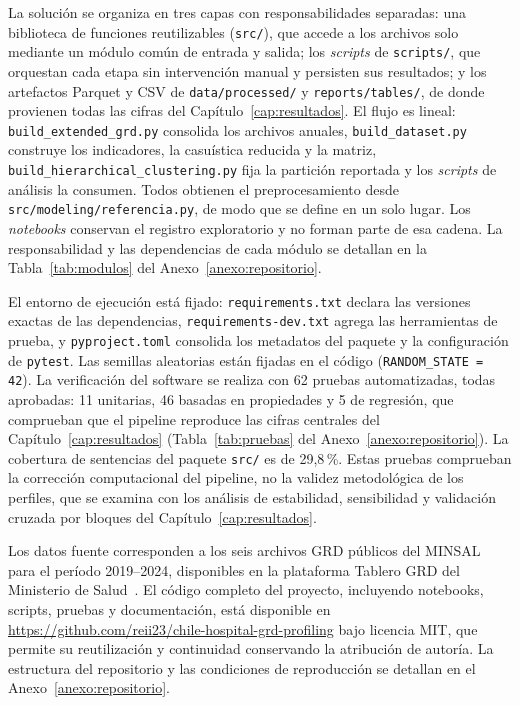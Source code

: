 La solución se organiza en tres capas con responsabilidades separadas: una
biblioteca de funciones reutilizables (\texttt{src/}), que accede a los archivos
solo mediante un módulo común de entrada y salida; los \textit{scripts} de
\texttt{scripts/}, que orquestan cada etapa sin intervención manual y persisten
sus resultados; y los artefactos Parquet y CSV de \texttt{data/processed/} y
\texttt{reports/tables/}, de donde provienen todas las cifras del
Capítulo~\ref{cap:resultados}. El flujo es lineal:
\texttt{build\_extended\_grd.py} consolida los archivos anuales,
\texttt{build\_dataset.py} construye los indicadores, la casuística reducida y
la matriz, \texttt{build\_hierarchical\_clustering.py} fija la partición
reportada y los \textit{scripts} de análisis la consumen. Todos obtienen el
preprocesamiento desde \texttt{src/modeling/referencia.py}, de modo que se
define en un solo lugar. Los \textit{notebooks} conservan el registro
exploratorio y no forman parte de esa cadena. La responsabilidad y las
dependencias de cada módulo se detallan en la Tabla~\ref{tab:modulos} del
Anexo~\ref{anexo:repositorio}.

El entorno de ejecución está fijado: \texttt{requirements.txt} declara las
versiones exactas de las dependencias, \texttt{requirements-dev.txt} agrega las
herramientas de prueba, y \texttt{pyproject.toml} consolida los metadatos del
paquete y la configuración de \texttt{pytest}. Las semillas aleatorias están
fijadas en el código (\texttt{RANDOM\_STATE = 42}). La verificación del
software se realiza con 62 pruebas automatizadas, todas aprobadas: 11
unitarias, 46 basadas en propiedades y 5 de regresión, que comprueban que el
pipeline reproduce las cifras centrales del Capítulo~\ref{cap:resultados}
(Tabla~\ref{tab:pruebas} del Anexo~\ref{anexo:repositorio}). La cobertura de
sentencias del paquete \texttt{src/} es de 29,8\,\%. Estas pruebas comprueban
la corrección computacional del pipeline, no la validez metodológica de los
perfiles, que se examina con los análisis de estabilidad, sensibilidad y
validación cruzada por bloques del Capítulo~\ref{cap:resultados}.

Los datos fuente corresponden a los seis archivos GRD públicos del MINSAL para el
período 2019--2024, disponibles en la plataforma Tablero GRD del Ministerio de
Salud~\citep{TableauGRD}. El código completo del proyecto, incluyendo notebooks,
scripts, pruebas y documentación, está disponible en
\url{https://github.com/reii23/chile-hospital-grd-profiling} bajo licencia MIT,
que permite su reutilización y continuidad conservando la atribución de autoría.
La estructura del repositorio y las condiciones de reproducción se detallan en el
Anexo~\ref{anexo:repositorio}.


